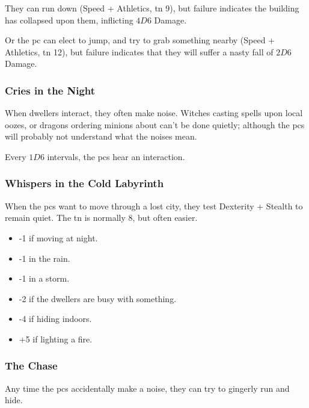 \begin{multicols}{2}
\begin{dlist}
  They can run down (Speed + Athletics, \gls{tn} 9), but failure indicates the building has collapsed upon them, inflicting $4D6$ Damage.

  Or the \gls{pc} can elect to jump, and try to grab something nearby (Speed + Athletics, \gls{tn} 12), but failure indicates that they will suffer a nasty fall of $2D6$ Damage.
\end{dlist}

\bigLine

\subsubsection{Cries in the Night}
\label{lostCries}

When dwellers interact, they often make noise.
Witches casting spells upon local oozes, or dragons ordering minions about can't be done quietly; although the \glspl{pc} will probably not understand what the noises mean.

Every $1D6$ \glspl{interval}, the \glspl{pc} hear an interaction.

\subsubsection{Whispers in the Cold Labyrinth}
\label{lostWhispers}

When the \glspl{pc} want to move through a lost city, they test Dexterity + Stealth to remain quiet.
The \gls{tn} is normally 8, but often easier.

\begin{itemize}
  \item
  -1 if moving at night.
  \item
  -1 in the rain.
  \item
  -1 in a storm.
  \item
  -2 if the dwellers are busy with something.
  \item
  -4 if hiding indoors.
  \item
  +5 if lighting a fire.
\end{itemize}

\subsubsection{The Chase}
\label{lostChase}

Any time the \glspl{pc} accidentally make a noise, they can try to gingerly run and hide.


\end{multicols}
